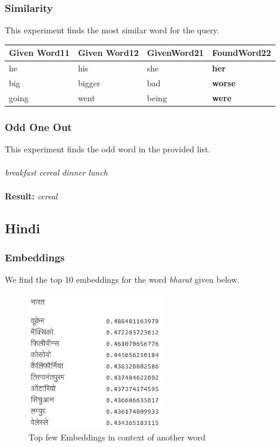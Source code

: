 \documentclass{article}
\begin{document}
\subsubsection{Similarity}
This experiment finds the most similar word for the query.
\begin{center}
    \begin{tabular}{ | l | l | l | l |}
    \hline
    Given Word11 & Given Word12 & GivenWord21 & FoundWord22  \\ \hline
    he & his & she & \textbf{her} \\ \hline
    big & bigger & bad & \textbf{worse} \\ \hline
    going & went & being & \textbf{were} \\ \hline
    \end{tabular}
\end{center}

\subsubsection{Odd One Out}
This experiment finds the odd word in the provided list.\\\\
\emph{breakfast}
\emph{cereal}
\emph{dinner}
\emph{lunch}
\\\\
\textbf{Result:} \emph{cereal}

\subsection{Hindi}
\subsubsection{Embeddings}
We find the top 10 embeddings for the word \emph{bharat} given below.
\begin{figure}[h!tb]
\centering
\includegraphics[width=6cm,height=6cm]{1.eps}
\caption {Top few Embeddings in context of another word}
\end{figure}
\end{document}

